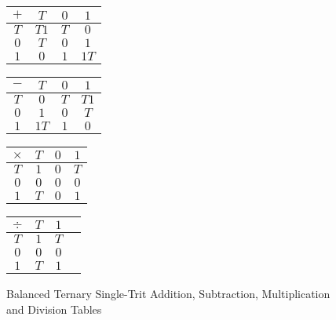 \documentclass[12pt]{article}
\begin{document}
\begin{figure}[h]
    \centering
    \begin{minipage}{0.22\textwidth}
        \centering   
        \begin{tabular}{|c||c|c|c|}
            \hline
            $+$ & $T$ & $0$ & $1$ \\
            \hline\hline
            $T$ & $T1$ & $T$ & $0$ \\
            \hline
            $0$ & $T$ & $0$ & $1$ \\
            \hline
            $1$ & $0$ & $1$ & $1T$ \\
            \hline
        \end{tabular}
    \end{minipage}
    \begin{minipage}{0.22\textwidth}
        \centering   
        \begin{tabular}{|c||c|c|c|}
            \hline
            $-$ & $T$ & $0$ & $1$ \\
            \hline\hline
            $T$ & $0$ & $T$ & \textbf{$T1$} \\
            \hline
            $0$ & $1$ & $0$ & $T$ \\
            \hline
            $1$ & \textbf{$1T$} & $1$ & $0$ \\
            \hline
        \end{tabular}
    \end{minipage}
    \begin{minipage}{0.22\textwidth}
        \centering   
        \begin{tabular}{|c||c|c|c|}
            \hline
            $\times$ & $T$ & $0$ & $1$ \\
            \hline\hline
            $T$ & $1$ & $0$ & $T$ \\
            \hline
            $0$ & $0$ & $0$ & $0$ \\
            \hline
            $1$ & $T$ & $0$ & $1$ \\
            \hline
        \end{tabular}
    \end{minipage}
    \begin{minipage}{0.22\textwidth}
        \centering   
        \begin{tabular}{|c||c|c|c|}
            \hline
            $\div$ & $T$ & $1$ \\
            \hline\hline
            $T$ & $1$ & $T$ \\
            \hline
            $0$ & $0$ & $0$ \\
            \hline
            $1$ & $T$ & $1$ \\
            \hline
        \end{tabular}
    \end{minipage}
    \caption{Balanced Ternary Single-Trit Addition, Subtraction, Multiplication and Division Tables}
    \label{fig:ternary_ops}
\end{figure}
\end{document}
